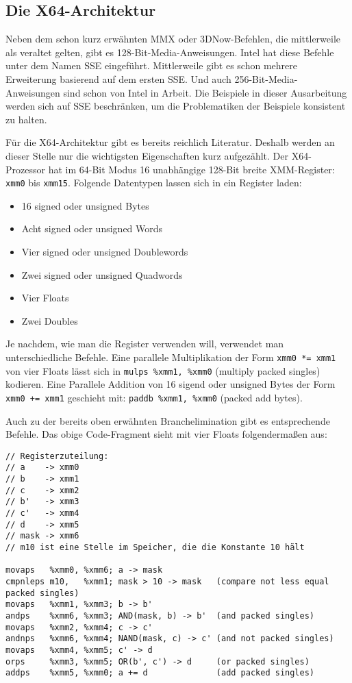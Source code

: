 \documentclass[a4paper,10pt]{article}
\begin{document}
\subsection{Die X64-Architektur}

Neben dem schon kurz erwähnten MMX oder 3DNow-Befehlen, die mittlerweile als veraltet gelten, gibt
es 128-Bit-Media-Anweisungen. Intel hat diese Befehle unter dem Namen SSE eingeführt.  Mittlerweile
gibt es schon mehrere Erweiterung basierend auf dem ersten SSE. Und auch 256-Bit-Media-Anweisungen
sind schon von Intel in Arbeit. Die Beispiele in dieser Ausarbeitung werden sich auf SSE
beschränken, um die Problematiken der Beispiele konsistent zu halten.

Für die X64-Architektur gibt es bereits reichlich Literatur. Deshalb werden an dieser Stelle nur die
wichtigsten Eigenschaften kurz aufgezählt. Der X64-Prozessor hat im 64-Bit Modus 16 unabhängige
128-Bit breite XMM-Register: \texttt{xmm0} bis \texttt{xmm15}. Folgende Datentypen lassen sich in
ein Register laden:

\begin{itemize}
    \item 16 signed oder unsigned Bytes
    \item Acht signed oder unsigned Words
    \item Vier signed oder unsigned Doublewords
    \item Zwei signed oder unsigned Quadwords
    \item Vier Floats
    \item Zwei Doubles
\end{itemize}

Je nachdem, wie man die Register verwenden will, verwendet man unterschiedliche Befehle. Eine
parallele Multiplikation der Form \texttt{xmm0 *= xmm1} von vier Floats lässt sich in \texttt{mulps
\%xmm1, \%xmm0} (multiply packed singles) kodieren. Eine Parallele Addition von 16 sigend oder
unsigned Bytes der Form \texttt{xmm0 += xmm1} geschieht mit: \texttt{paddb \%xmm1, \%xmm0} (packed
add bytes). 

Auch zu der bereits oben erwähnten Branchelimination gibt es entsprechende Befehle. Das obige
Code-Fragment sieht mit vier Floats folgendermaßen aus:

\begin{verbatim}
// Registerzuteilung:
// a    -> xmm0
// b    -> xmm1
// c    -> xmm2
// b'   -> xmm3
// c'   -> xmm4
// d    -> xmm5
// mask -> xmm6
// m10 ist eine Stelle im Speicher, die die Konstante 10 hält

movaps   %xmm0, %xmm6; a -> mask
cmpnleps m10,   %xmm1; mask > 10 -> mask   (compare not less equal packed singles)
movaps   %xmm1, %xmm3; b -> b'
andps    %xmm6, %xmm3; AND(mask, b) -> b'  (and packed singles) 
movaps   %xmm2, %xmm4; c -> c'
andnps   %xmm6, %xmm4; NAND(mask, c) -> c' (and not packed singles)
movaps   %xmm4, %xmm5; c' -> d
orps     %xmm3, %xmm5; OR(b', c') -> d     (or packed singles)
addps    %xmm5, %xmm0; a += d              (add packed singles)
\end{verbatim}
\end{document}
